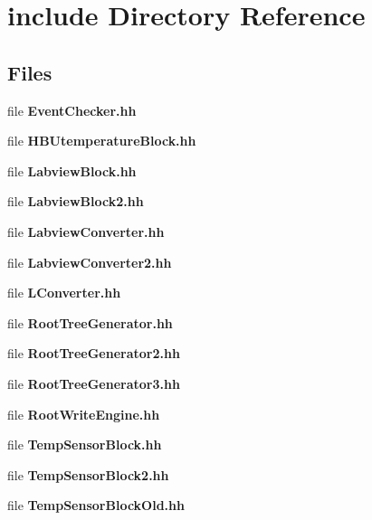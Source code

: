 \section{include Directory Reference}
\label{dir_47f340f33e0893b4687098bd7278fdb1}
\subsection*{Files}
\begin{DoxyCompactItemize}
\item 
file {\bfseries Event\-Checker.\-hh}
\item 
file {\bfseries H\-B\-Utemperature\-Block.\-hh}
\item 
file {\bfseries Labview\-Block.\-hh}
\item 
file {\bfseries Labview\-Block2.\-hh}
\item 
file {\bfseries Labview\-Converter.\-hh}
\item 
file {\bfseries Labview\-Converter2.\-hh}
\item 
file {\bfseries L\-Converter.\-hh}
\item 
file {\bfseries Root\-Tree\-Generator.\-hh}
\item 
file {\bfseries Root\-Tree\-Generator2.\-hh}
\item 
file {\bfseries Root\-Tree\-Generator3.\-hh}
\item 
file {\bfseries Root\-Write\-Engine.\-hh}
\item 
file {\bfseries Temp\-Sensor\-Block.\-hh}
\item 
file {\bfseries Temp\-Sensor\-Block2.\-hh}
\item 
file {\bfseries Temp\-Sensor\-Block\-Old.\-hh}
\end{DoxyCompactItemize}
